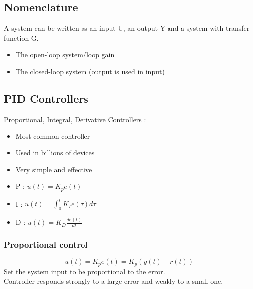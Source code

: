 \documentclass[../main.tex]{subfiles}
\begin{document}
\localtableofcontents
\subsection{Nomenclature}
A system can be written as an input U, an output Y and a system with transfer function G.\\
\begin{itemize}
    \item The open-loop system/loop gain\\
    \item The closed-loop system (output is used in input)\\
\end{itemize}

\subsection{PID Controllers}
\underline{Proportional, Integral, Derivative Controllers :}\\
\begin{itemize}
    \item Most common controller\\
    \item Used in billions of devices\\
    \item Very simple and effective\\
\end{itemize}

\begin{itemize}
    \item P : $u(t) = K_p e(t)$\\
    \item I : $u(t) = \int_0^t K_I e(\tau) d\tau$\\
    \item D : $u(t) = K_D \frac{de(t)}{dt}$\\
\end{itemize}

\subsubsection{Proportional control}
\begin{equation}
    u(t) = K_p e(t) = K_p (y(t)-r(t))
\end{equation}
Set the system input to be proportional to the error.\\
Controller responds strongly to a large error and weakly to a small one.\\
\end{document}
